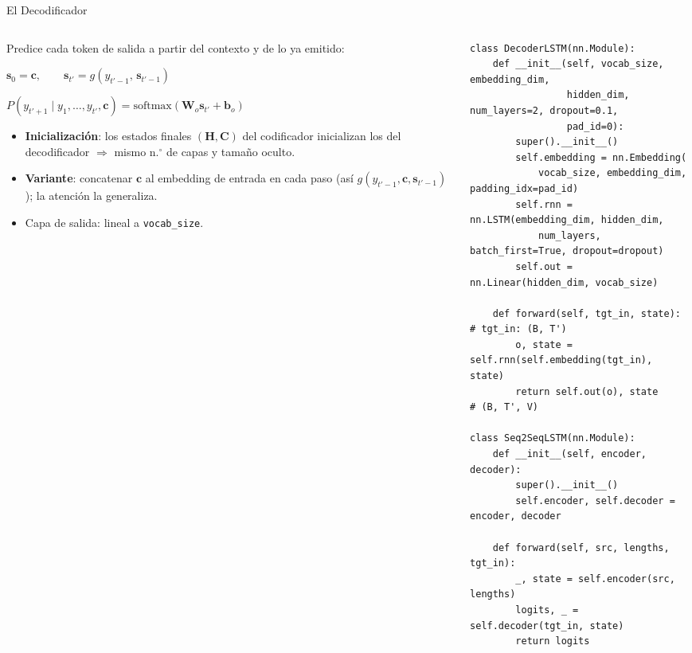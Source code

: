 \documentclass[aspectratio=169, 10pt]{beamer}
\newcommand{\formula}[1]{%
	\begin{tcolorbox}[colback=UCMBlue!8, colframe=UCMBlue, arc=4pt,
		boxsep=2pt, left=6pt, right=6pt, top=3pt, bottom=3pt]
		#1
	\end{tcolorbox}
}
\begin{document}
\begin{frame}{El Decodificador}

	\begin{columns}[T]
		\begin{column}{0.42\textwidth}
			\small
			Predice cada token de salida a partir del contexto y de lo ya emitido:
			\formula{\centering $\mathbf{s}_0 = \mathbf{c},\qquad \mathbf{s}_{t'} = g(y_{t'-1},\, \mathbf{s}_{t'-1})$}
			\formula{\centering $P(y_{t'+1}\mid y_1,\ldots,y_{t'},\mathbf{c}) = \mathrm{softmax}(\mathbf{W}_o\mathbf{s}_{t'}+\mathbf{b}_o)$}
			\begin{itemize}
				\item \textbf{Inicializaci\'on}: los estados finales $(\mathbf{H},\mathbf{C})$ del codificador inicializan los del decodificador $\Rightarrow$ mismo n.$^\circ$ de capas y tama\~no oculto.
				\item \textbf{Variante}: concatenar $\mathbf{c}$ al embedding de entrada en cada paso (as\'i $g(y_{t'-1},\mathbf{c},\mathbf{s}_{t'-1})$); la atenci\'on la generaliza.
				\item Capa de salida: lineal a \texttt{vocab\_size}.
			\end{itemize}
		\end{column}

		\begin{column}{0.55\textwidth}
			\begin{tcolorbox}[codebox]
\scriptsize
\begin{verbatim}
class DecoderLSTM(nn.Module):
    def __init__(self, vocab_size, embedding_dim,
                 hidden_dim, num_layers=2, dropout=0.1,
                 pad_id=0):
        super().__init__()
        self.embedding = nn.Embedding(
            vocab_size, embedding_dim, padding_idx=pad_id)
        self.rnn = nn.LSTM(embedding_dim, hidden_dim,
            num_layers, batch_first=True, dropout=dropout)
        self.out = nn.Linear(hidden_dim, vocab_size)

    def forward(self, tgt_in, state):  # tgt_in: (B, T')
        o, state = self.rnn(self.embedding(tgt_in), state)
        return self.out(o), state      # (B, T', V)

class Seq2SeqLSTM(nn.Module):
    def __init__(self, encoder, decoder):
        super().__init__()
        self.encoder, self.decoder = encoder, decoder

    def forward(self, src, lengths, tgt_in):
        _, state = self.encoder(src, lengths)
        logits, _ = self.decoder(tgt_in, state)
        return logits
\end{verbatim}
			\end{tcolorbox}
		\end{column}
	\end{columns}

\end{frame}
\end{document}
